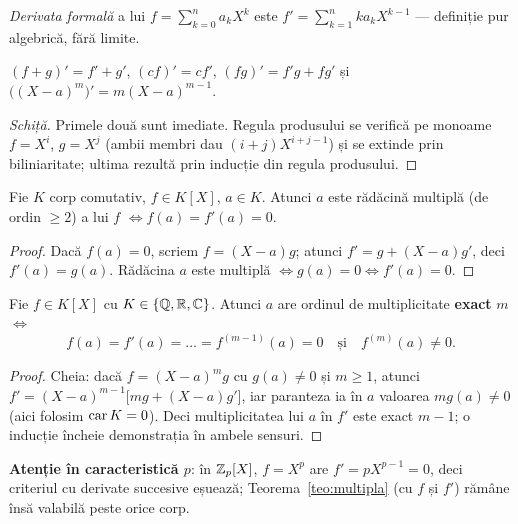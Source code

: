 \begin{definitie}
\emph{Derivata formală} a lui $f=\sum_{k=0}^{n}a_kX^k$ este $f'=\sum_{k=1}^{n}ka_kX^{k-1}$ --- definiție pur algebrică, fără limite.
\end{definitie}

\begin{propozitie}\label{prop:derivata}
$(f+g)'=f'+g'$, $(cf)'=cf'$, $(fg)'=f'g+fg'$ și $\bigl((X-a)^m\bigr)'=m(X-a)^{m-1}$.
\end{propozitie}

\begin{proof}[Schiță]
Primele două sunt imediate. Regula produsului se verifică pe monoame $f=X^i$, $g=X^j$ (ambii membri dau $(i+j)X^{i+j-1}$) și se extinde prin biliniaritate; ultima rezultă prin inducție din regula produsului.
\end{proof}

\begin{teorema}\label{teo:multipla}
Fie $K$ corp comutativ, $f\in K[X]$, $a\in K$. Atunci $a$ este rădăcină multiplă (de ordin $\ge2$) a lui $f$ $\iff f(a)=f'(a)=0$.
\end{teorema}

\begin{proof}
Dacă $f(a)=0$, scriem $f=(X-a)g$; atunci $f'=g+(X-a)g'$, deci $f'(a)=g(a)$. Rădăcina $a$ este multiplă $\iff g(a)=0\iff f'(a)=0$.
\end{proof}

\begin{teorema}\label{teo:derivatesucc}
Fie $f\in K[X]$ cu $K\in\{\mathbb{Q},\mathbb{R},\mathbb{C}\}$. Atunci $a$ are ordinul de multiplicitate \textbf{exact} $m$ $\iff$
\[
f(a)=f'(a)=\dots=f^{(m-1)}(a)=0\quad\text{și}\quad f^{(m)}(a)\neq0.
\]
\end{teorema}

\begin{proof}
Cheia: dacă $f=(X-a)^mg$ cu $g(a)\neq0$ și $m\ge1$, atunci
$f'=(X-a)^{m-1}\bigl[mg+(X-a)g'\bigr]$, iar paranteza ia în $a$ valoarea $mg(a)\neq0$ (aici folosim $\operatorname{car} K=0$). Deci multiplicitatea lui $a$ în $f'$ este exact $m-1$; o inducție încheie demonstrația în ambele sensuri.
\end{proof}

\begin{observatie}
\textbf{Atenție în caracteristică $p$}: în $\mathbb{Z}_p[X]$, $f=X^p$ are $f'=pX^{p-1}=0$, deci criteriul cu derivate succesive eșuează; Teorema~\ref{teo:multipla} (cu $f$ și $f'$) rămâne însă valabilă peste orice corp.
\end{observatie}

